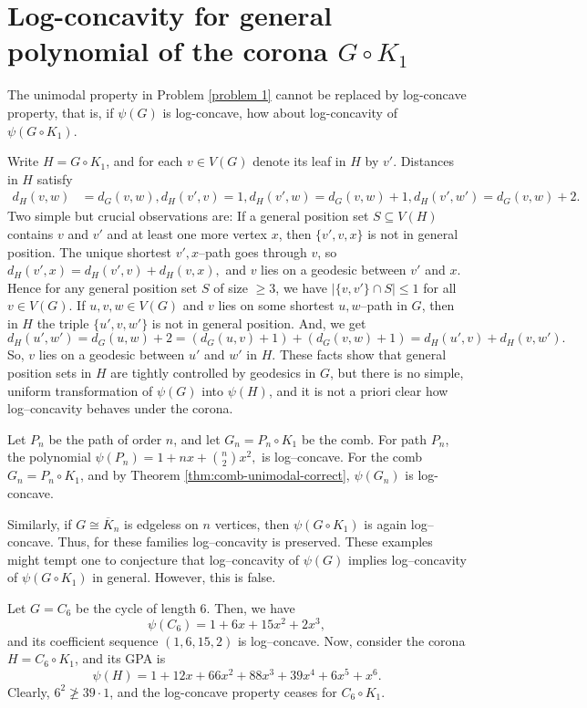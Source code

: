 \documentclass[12pt,twoside]{article}
\begin{document}
	\section{Log-concavity for general polynomial of the corona $G\circ K_1$}\label{section 7}
	The unimodal property in Problem \ref{problem 1} cannot be replaced by log-concave property, that is, if $\psi(G)$ is log-concave, how about log-concavity of  $\psi(G\circ K_1)$. 
	
	Write $H=G\circ K_1$, and for each $v\in V(G)$ denote its leaf in $H$ by $v'$.
	Distances in $H$ satisfy
	\begin{align*}
		d_H(v,w) &= d_G(v,w),d_H(v',v) = 1,d_H(v',w) = d_G(v,w)+1,d_H(v',w') = d_G(v,w)+2.
	\end{align*}
	Two simple but crucial observations are: If a general position set $S\subseteq V(H)$ contains $v$ and $v'$ and
		at least one more vertex $x$, then $\{v',v,x\}$ is not in general position. The unique shortest $v',x$–path goes through $v$, so $d_H(v',x)=d_H(v',v)+d_H(v,x),$ and $v$ lies on a geodesic between $v'$ and $x$.  
		Hence for any general position set $S$ of size $\ge 3$, we have $  |\{v,v'\}\cap S|\le 1$ for all $v\in V(G).$ If $u,v,w\in V(G)$ and $v$ lies on some shortest $u,w$–path in $G$, then in $H$ the triple $\{u',v,w'\}$ is not in general position. And, we get
		\[
		d_H(u',w') = d_G(u,w)+2 = (d_G(u,v)+1)+(d_G(v,w)+1) = d_H(u',v)+d_H(v,w').
		\]
		So, $v$ lies on a geodesic between $u'$ and $w'$ in $H$. These facts show that general position sets in $H$ are tightly controlled by geodesics in $G$, but there is no simple, uniform transformation of $\psi(G)$ into $\psi(H)$, and it is not a priori clear how log–concavity 	behaves under the corona.
	
	 Let $P_n$ be the path of order $n$, and let $G_n=P_n\circ K_1$ be the comb.  For path $P_{n}$, the polynomial  $\psi(P_n)=1+nx+\binom{n}{2}x^2,$ is log–concave.  For the comb $G_n=P_n\circ K_1$, and by Theorem \ref{thm:comb-unimodal-correct}, $\psi(G_n)$ is log-concave.


	
	Similarly, if $G\cong \overline{K}_{n}$ is edgeless on $n$ vertices, then   $\psi(G\circ K_1)$  is again log–concave.  Thus, for these families log–concavity is	preserved. These examples might tempt one to conjecture that log–concavity of $\psi(G)$	implies log–concavity of $\psi(G\circ K_1)$ in general.  However, this is
	false. 
	
	Let $G=C_6$ be the cycle of length $6$. Then, we have
		\[
		\psi(C_6)=1+6x+15x^2+2x^3,
		\]
		and its coefficient sequence $(1,6,15,2)$ is log–concave.  Now, consider the corona $H=C_6\circ K_1$, and its GPA is
		\[
		\psi(H)
		= 1 + 12x + 66x^2 + 88x^3 + 39x^4 + 6x^5 + x^6.
		\]
		Clearly, $6^{2}\ngeq 39\cdot 1$, and the log-concave property ceases for $C_6\circ K_1.$
	
\end{document}
